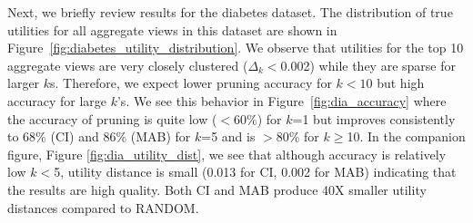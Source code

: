 


 
Next, we briefly review results for the diabetes dataset.
The distribution of true utilities for all aggregate views in this dataset are shown in
Figure~\ref{fig:diabetes_utility_distribution}.
We observe that utilities for the top 10 aggregate views are very closely clustered ($\Delta_k<$0.002) while
they are sparse for larger $k$s.
Therefore, we expect lower pruning accuracy for $k<10$ but high accuracy for
large $k$'s.
We see this behavior in Figure~\ref{fig:dia_accuracy} where the accuracy of
pruning is quite low ($<60\%$) for $k$=1 but improves consistently to 68\% (CI) 
and 86\% (MAB) for $k$=5 and is $>$80\% for $k$$\geq$10.
In the companion figure, Figure \ref{fig:dia_utility_dist}, we see that although
accuracy is relatively low $k$$<$5, utility distance is small (0.013 for CI, 0.002
for MAB) indicating that the results are high quality.
Both CI and MAB produce 40X smaller utility distances compared to RANDOM.

